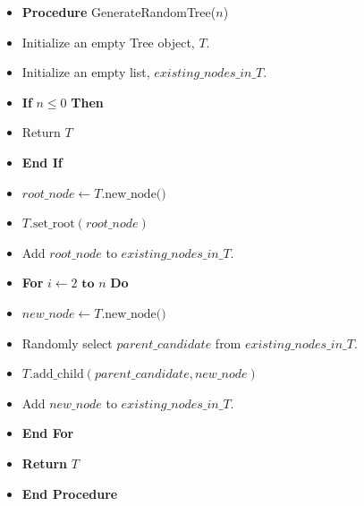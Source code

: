 \documentclass{article}
\begin{document}
\begin{itemize}
    \item \textbf{Procedure} GenerateRandomTree($n$)
    \item \hspace{0.5cm} Initialize an empty Tree object, $T$.
    \item \hspace{0.5cm} Initialize an empty list, $existing\_nodes\_in\_T$.
    
    \item \hspace{0.5cm} \textbf{If} $n \le 0$ \textbf{Then}
    \item \hspace{1cm} Return $T$
    \item \hspace{0.5cm} \textbf{End If}
    
    \item \hspace{0.5cm} $root\_node \gets T.\text{new\_node()}$
    \item \hspace{0.5cm} $T.\text{set\_root}(root\_node)$
    \item \hspace{0.5cm} Add $root\_node$ to $existing\_nodes\_in\_T$.
    
    \item \hspace{0.5cm} \textbf{For} $i \gets 2 \textbf{ to } n$ \textbf{Do}
    \item \hspace{1cm} $new\_node \gets T.\text{new\_node()}$
    \item \hspace{1cm} Randomly select $parent\_candidate$ from $existing\_nodes\_in\_T$.
    \item \hspace{1cm} $T.\text{add\_child}(parent\_candidate, new\_node)$
    \item \hspace{1cm} Add $new\_node$ to $existing\_nodes\_in\_T$.
    \item \hspace{0.5cm} \textbf{End For}
    
    \item \hspace{0.5cm} \textbf{Return} $T$
    \item \textbf{End Procedure}
\end{itemize}
\end{document}
